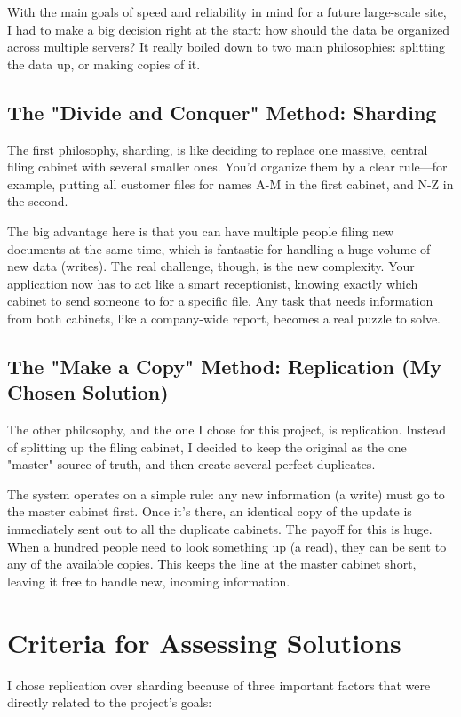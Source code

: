 \documentclass[conference]{IEEEtran}
\begin{document}
With the main goals of speed and reliability in mind for a future large-scale site, I had to make a big decision right at the start: how should the data be organized across multiple servers? It really boiled down to two main philosophies: splitting the data up, or making copies of it.


\subsection{The "Divide and Conquer" Method: Sharding}
The first philosophy, sharding, is like deciding to replace one massive, central filing cabinet with several smaller ones. You'd organize them by a clear rule—for example, putting all customer files for names A-M in the first cabinet, and N-Z in the second.

The big advantage here is that you can have multiple people filing new documents at the same time, which is fantastic for handling a huge volume of new data (writes). The real challenge, though, is the new complexity. Your application now has to act like a smart receptionist, knowing exactly which cabinet to send someone to for a specific file. Any task that needs information from both cabinets, like a company-wide report, becomes a real puzzle to solve.

\subsection{The "Make a Copy" Method: Replication (My Chosen Solution)}
The other philosophy, and the one I chose for this project, is replication. Instead of splitting up the filing cabinet, I decided to keep the original as the one "master" source of truth, and then create several perfect duplicates.

The system operates on a simple rule: any new information (a write) must go to the master cabinet first. Once it's there, an identical copy of the update is immediately sent out to all the duplicate cabinets. The payoff for this is huge. When a hundred people need to look something up (a read), they can be sent to any of the available copies. This keeps the line at the master cabinet short, leaving it free to handle new, incoming information.


\section{Criteria for Assessing Solutions} \label{sec:criteria}
I chose replication over sharding because of three important factors that were directly related to the project's goals:
\end{document}
